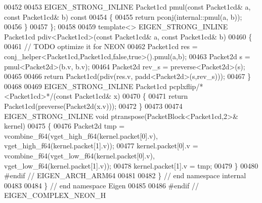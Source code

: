 \begin{DoxyCode}
00452 
00453   EIGEN\_STRONG\_INLINE Packet1cd pmul(\textcolor{keyword}{const} Packet1cd& a, \textcolor{keyword}{const} Packet1cd& b)\textcolor{keyword}{ const}
00454 \textcolor{keyword}{  }\{
00455     \textcolor{keywordflow}{return} pconj(internal::pmul(a, b));
00456   \}
00457 \};
00458 
00459 \textcolor{keyword}{template}<> EIGEN\_STRONG\_INLINE Packet1cd pdiv<Packet1cd>(\textcolor{keyword}{const} Packet1cd& a, \textcolor{keyword}{const} Packet1cd& b)
00460 \{
00461   \textcolor{comment}{// TODO optimize it for NEON}
00462   Packet1cd res = conj\_helper<Packet1cd,Packet1cd,false,true>().pmul(a,b);
00463   Packet2d s = pmul<Packet2d>(b.v, b.v);
00464   Packet2d rev\_s = preverse<Packet2d>(s);
00465 
00466   \textcolor{keywordflow}{return} Packet1cd(pdiv(res.v, padd<Packet2d>(s,rev\_s)));
00467 \}
00468 
00469 EIGEN\_STRONG\_INLINE Packet1cd pcplxflip\textcolor{comment}{/*<Packet1cd>*/}(\textcolor{keyword}{const} Packet1cd& x)
00470 \{
00471   \textcolor{keywordflow}{return} Packet1cd(preverse(Packet2d(x.v)));
00472 \}
00473 
00474 EIGEN\_STRONG\_INLINE \textcolor{keywordtype}{void} ptranspose(PacketBlock<Packet1cd,2>& kernel)
00475 \{
00476   Packet2d tmp = vcombine\_f64(vget\_high\_f64(kernel.packet[0].v), vget\_high\_f64(kernel.packet[1].v));
00477   kernel.packet[0].v = vcombine\_f64(vget\_low\_f64(kernel.packet[0].v), vget\_low\_f64(kernel.packet[1].v));
00478   kernel.packet[1].v = tmp;
00479 \}
00480 \textcolor{preprocessor}{#endif // EIGEN\_ARCH\_ARM64}
00481 
00482 \} \textcolor{comment}{// end namespace internal}
00483 
00484 \} \textcolor{comment}{// end namespace Eigen}
00485 
00486 \textcolor{preprocessor}{#endif // EIGEN\_COMPLEX\_NEON\_H}
\end{DoxyCode}
